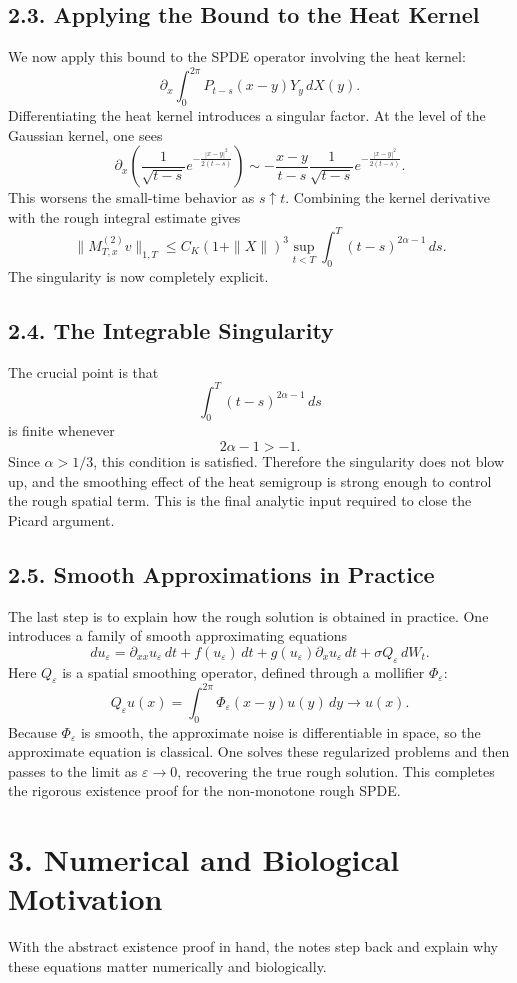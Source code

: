 \documentclass[11pt]{article}
\theoremstyle{definition}
\theoremstyle{remark}
\begin{document}
\subsection*{2.3. Applying the Bound to the Heat Kernel}
We now apply this bound to the SPDE operator involving the heat kernel:
\[
\partial_x \int_0^{2\pi} P_{t-s}(x-y)Y_y\,dX(y).
\]
Differentiating the heat kernel introduces a singular factor. At the level of the Gaussian kernel, one sees
\[
\partial_x\left(
\frac{1}{\sqrt{t-s}}
e^{-\frac{|x-y|^2}{2(t-s)}}
\right)
\sim
-
\frac{x-y}{t-s}
\frac{1}{\sqrt{t-s}}
e^{-\frac{|x-y|^2}{2(t-s)}}.
\]
This worsens the small-time behavior as \(s\uparrow t\). Combining the kernel derivative with the rough integral estimate gives
\[
\|M^{(2)}_{T,x}v\|_{1,T}
\le
C_K(1+\|X\|)^3
\sup_{t<T}\int_0^T (t-s)^{2\alpha-1}\,ds.
\]
The singularity is now completely explicit.

\subsection*{2.4. The Integrable Singularity}
The crucial point is that
\[
\int_0^T (t-s)^{2\alpha-1}\,ds
\]
is finite whenever
\[
2\alpha-1>-1.
\]
Since \(\alpha>1/3\), this condition is satisfied. Therefore the singularity does not blow up, and the smoothing effect of the heat semigroup is strong enough to control the rough spatial term. This is the final analytic input required to close the Picard argument.

\subsection*{2.5. Smooth Approximations in Practice}
The last step is to explain how the rough solution is obtained in practice. One introduces a family of smooth approximating equations
\[
du_\varepsilon
=
\partial_{xx}u_\varepsilon\,dt
+
f(u_\varepsilon)\,dt
+
g(u_\varepsilon)\partial_xu_\varepsilon\,dt
+
\sigma Q_\varepsilon\,dW_t.
\]
Here \(Q_\varepsilon\) is a spatial smoothing operator, defined through a mollifier \(\Phi_\varepsilon\):
\[
Q_\varepsilon u(x)
=
\int_0^{2\pi}\Phi_\varepsilon(x-y)u(y)\,dy
\to u(x).
\]
Because \(\Phi_\varepsilon\) is smooth, the approximate noise is differentiable in space, so the approximate equation is classical. One solves these regularized problems and then passes to the limit as \(\varepsilon\to 0\), recovering the true rough solution. This completes the rigorous existence proof for the non-monotone rough SPDE.

\section*{3. Numerical and Biological Motivation}
With the abstract existence proof in hand, the notes step back and explain why these equations matter numerically and biologically.
\end{document}
